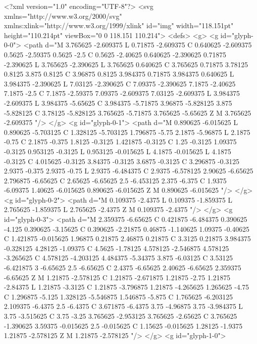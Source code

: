 <?xml version="1.0" encoding="UTF-8"?>
<svg xmlns="http://www.w3.org/2000/svg" xmlns:xlink="http://www.w3.org/1999/xlink" id="img" width="118.151pt" height="110.214pt" viewBox="0 0 118.151 110.214">
<defs>
<g>
<g id="glyph-0-0">
<path d="M 3.765625 -2.609375 L 0.71875 -2.609375 C 0.640625 -2.609375 0.5625 -2.59375 0.5625 -2.5 C 0.5625 -2.40625 0.640625 -2.390625 0.71875 -2.390625 L 3.765625 -2.390625 L 3.765625 0.640625 C 3.765625 0.71875 3.78125 0.8125 3.875 0.8125 C 3.96875 0.8125 3.984375 0.71875 3.984375 0.640625 L 3.984375 -2.390625 L 7.03125 -2.390625 C 7.09375 -2.390625 7.1875 -2.40625 7.1875 -2.5 C 7.1875 -2.59375 7.09375 -2.609375 7.03125 -2.609375 L 3.984375 -2.609375 L 3.984375 -5.65625 C 3.984375 -5.71875 3.96875 -5.828125 3.875 -5.828125 C 3.78125 -5.828125 3.765625 -5.71875 3.765625 -5.65625 Z M 3.765625 -2.609375 "/>
</g>
<g id="glyph-0-1">
<path d="M 0.890625 -6.015625 L 0.890625 -5.703125 C 1.328125 -5.703125 1.796875 -5.75 2.1875 -5.96875 L 2.1875 -0.75 C 2.1875 -0.375 1.8125 -0.3125 1.421875 -0.3125 C 1.25 -0.3125 1.09375 -0.3125 0.953125 -0.3125 L 0.953125 -0.015625 L 4.1875 -0.015625 L 4.1875 -0.3125 C 4.015625 -0.3125 3.84375 -0.3125 3.6875 -0.3125 C 3.296875 -0.3125 2.9375 -0.375 2.9375 -0.75 L 2.9375 -6.484375 C 2.9375 -6.578125 2.90625 -6.65625 2.796875 -6.65625 C 2.65625 -6.65625 2.5 -6.453125 2.375 -6.375 C 1.9375 -6.09375 1.40625 -6.015625 0.890625 -6.015625 Z M 0.890625 -6.015625 "/>
</g>
<g id="glyph-0-2">
<path d="M 0.109375 -2.4375 L 0.109375 -1.859375 L 2.765625 -1.859375 L 2.765625 -2.4375 Z M 0.109375 -2.4375 "/>
</g>
<g id="glyph-0-3">
<path d="M 2.359375 -6.65625 C 0.421875 -6.484375 0.390625 -4.125 0.390625 -3.15625 C 0.390625 -2.21875 0.46875 -1.140625 1.09375 -0.40625 C 1.421875 -0.015625 1.96875 0.21875 2.46875 0.21875 C 3.3125 0.21875 3.984375 -0.328125 4.28125 -1.09375 C 4.5625 -1.78125 4.578125 -2.546875 4.578125 -3.265625 C 4.578125 -4.203125 4.484375 -5.34375 3.875 -6.03125 C 3.53125 -6.421875 3 -6.65625 2.5 -6.65625 C 2.4375 -6.65625 2.40625 -6.65625 2.359375 -6.65625 Z M 1.21875 -2.578125 C 1.21875 -2.671875 1.21875 -2.75 1.21875 -2.84375 L 1.21875 -3.3125 C 1.21875 -3.796875 1.21875 -4.265625 1.265625 -4.75 C 1.296875 -5.125 1.328125 -5.546875 1.546875 -5.875 C 1.765625 -6.203125 2.109375 -6.4375 2.5 -6.4375 C 3.671875 -6.4375 3.75 -4.96875 3.75 -3.984375 L 3.75 -3.515625 C 3.75 -3.25 3.765625 -2.953125 3.765625 -2.65625 C 3.765625 -1.390625 3.59375 -0.015625 2.5 -0.015625 C 1.15625 -0.015625 1.28125 -1.9375 1.21875 -2.578125 Z M 1.21875 -2.578125 "/>
</g>
<g id="glyph-1-0">
